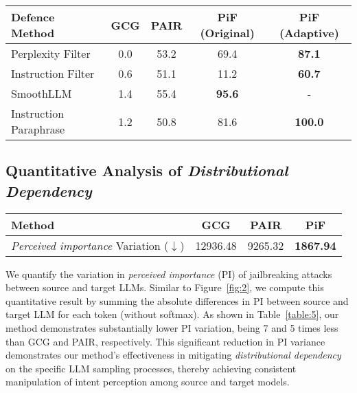 \begin{table*}[t]
\setlength{\tabcolsep}{15.7pt}
\fontsize{9.5}{10.}\selectfont
\caption{Compare the post-defence ASR ($\uparrow$) under various defence methods on Llama-2-13B-Chat.}
\vspace{-0.4em}
\label{table:4}
\centering
  \begin{tabular}{l | c c c c}
    \toprule
    \toprule
     {Defence Method} & GCG & PAIR & PiF (Original) & PiF (Adaptive) \\
    \midrule
    {Perplexity Filter} & 0.0 & 53.2 &\cellcolor{SelfColor!15} 69.4&\cellcolor{SelfColor!15}\textbf{87.1}\\
    {Instruction Filter} & 0.6 & 51.1 &\cellcolor{SelfColor!15} 11.2&\cellcolor{SelfColor!15}\textbf{60.7}\\
    {SmoothLLM} & 1.4 & 55.4 &\cellcolor{SelfColor!15} \textbf{95.6}&\cellcolor{SelfColor!15}-\\
    {Instruction Paraphrase} &1.2 & 50.8	 &\cellcolor{SelfColor!15} 81.6&\cellcolor{SelfColor!15}\textbf{100.0}\\
    \bottomrule
   \bottomrule
  \end{tabular}
\vspace{-0.8em}
\end{table*}

\subsection{Quantitative Analysis of \emph{Distributional Dependency}}
\label{section:5_3}

\begin{table*}[t]
\setlength{\tabcolsep}{21pt} %
\fontsize{9.5}{10.}\selectfont
\caption{{Compare the change in jailbreaking attacks PI between source and target LLMs on AdvBench.}}
\vspace{-0.4em}
\label{table:5}
\centering
  \begin{tabular}{l | c  c  c}
    \toprule
    \toprule
    {Method} & {GCG} & {PAIR} & {PiF} \\
    \midrule
    {\emph{Perceived importance} Variation ($\downarrow$)} & {12936.48} & {9265.32} & \cellcolor{SelfColor!15}\textbf{{1867.94}} \\ 
    \bottomrule
    \bottomrule
  \end{tabular}
  \vspace{-0.4em}
\end{table*}

We quantify the variation in \emph{perceived importance} (PI) of jailbreaking attacks between source and target LLMs.
Similar to Figure~\ref{fig:2}, we compute this quantitative result by summing the absolute differences in PI between source and target LLM for each token (without softmax).
As shown in Table~\ref{table:5}, our method demonstrates substantially lower PI variation, being 7 and 5 times less than GCG and PAIR, respectively. This significant reduction in PI variance demonstrates our method's effectiveness in mitigating \emph{distributional dependency} on the specific LLM sampling processes, thereby achieving consistent manipulation of intent perception among source and target models.


